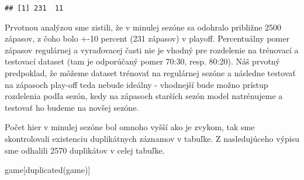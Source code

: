 \documentclass[
]{article}
\newenvironment{Shaded}{\begin{snugshade}}{\end{snugshade}}
\newcommand{\FunctionTok}[1]{\textcolor[rgb]{0.00,0.00,0.00}{#1}}
\newcommand{\NormalTok}[1]{#1}
\begin{document}
\begin{verbatim}
## [1] 231  11
\end{verbatim}

Prvotnou analýzou sme zistili, že v minulej sezóne sa odohralo približne
2500 zápasov, z čoho bolo +-10 percent (231 zápasov) v playoff.
Percentuálny pomer zápasov regulárnej a vyraďovacej časti nie je vhodný
pre rozdelenie na trénovací a testovací dataset (tam je odporúčaný pomer
70:30, resp. 80:20). Náš prvotný predpoklad, že môžeme dataset trénovať
na regulárnej sezóne a následne testovať na zápasoch play-off teda
nebude ideálny - vhodnejší bude možno prístup rozdelenia podľa sezón,
kedy na zápasoch starších sezón model natrénujeme a testovať ho budeme
na novšej sezóne.

Počet hier v minulej sezóne bol omnoho vyšší ako je zvykom, tak sme
skontrolovali existenciu duplikátnych záznamov v tabuľke. Z
nasledujúceho výpisu sme odhalili 2570 duplikátov v celej tabuľke.

\begin{Shaded}
\begin{Highlighting}[]
\NormalTok{game[}\FunctionTok{duplicated}\NormalTok{(game)]}
\end{Highlighting}
\end{Shaded}
\end{document}
